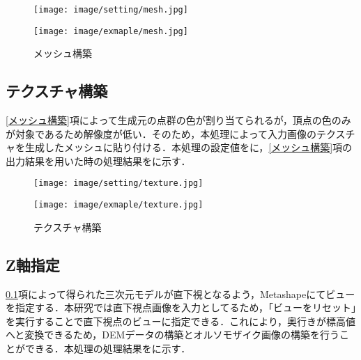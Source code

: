       \begin{figure}[t]
        \begin{minipage}[c]{0.45\hsize}
          \centering
          \texttt{[image: image/setting/mesh.jpg]}
          \label{メッシュ構築設定値}
        \end{minipage}
        \begin{minipage}[c]{0.45\hsize}
          \centering
          \texttt{[image: image/exmaple/mesh.jpg]}
          \label{メッシュ構築結果}
        \end{minipage}
        \caption{メッシュ構築}
      \end{figure}

    \subsection{テクスチャ構築}
      \label{テクスチャ構築}
      \ref{メッシュ構築}項によって生成元の点群の色が割り当てられるが，頂点の色のみが対象であるため解像度が低い．そのため，本処理によって入力画像のテクスチャを生成したメッシュに貼り付ける．本処理の設定値をに，\ref{メッシュ構築}項の出力結果を用いた時の処理結果をに示す．

      \begin{figure}[t]
        \begin{minipage}[c]{0.45\hsize}
          \centering
          \texttt{[image: image/setting/texture.jpg]}
          \label{テクスチャ構築設定値}
        \end{minipage}
        \begin{minipage}[c]{0.45\hsize}
          \centering
          \texttt{[image: image/exmaple/texture.jpg]}
          \label{テクスチャ構築結果}
        \end{minipage}
        \caption{テクスチャ構築}
      \end{figure}

    \subsection{Z軸指定}
      \label{Z軸指定}
      \ref{テクスチャ構築}項によって得られた三次元モデルが直下視となるよう，Metashapeにてビューを指定する．本研究では直下視点画像を入力としてるため，「ビューをリセット」を実行することで直下視点のビューに指定できる．これにより，奥行きが標高値へと変換できるため，DEMデータの構築とオルソモザイク画像の構築を行うことができる．本処理の処理結果をに示す．

